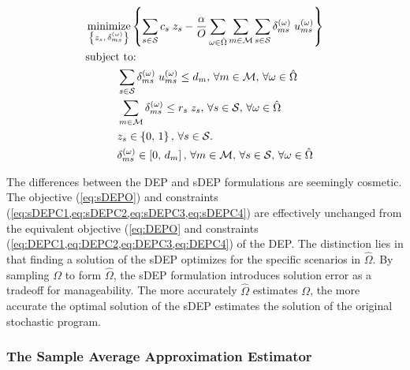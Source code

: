 \documentclass[12pt,dvipsnames]{report}
\DeclareMathOperator*{\argmin}{minimize}
\begin{document}
\begin{tcolorbox}[floatplacement = !ht, float, title = Sampled Deterministic Equivalent Program (sDEP) of \Cref{eq:SOPS1O,eq:SOPS1C1,eq:SOPS2O,eq:SOPS2C1,eq:SOPS2C2,eq:SOPS2C3,eq:SOPS2C4}]
\begin{align}
& \argmin_{\left\{ z_s,\, \delta_{ms}^{\left( \omega \right)} \right\}} \left\{ \sum_{s \in \mathcal{S}} c_s \; z_s - \frac{\alpha}{O} \sum_{\omega \in \hat{\Omega}} \sum_{m \in \mathcal{M}} \sum_{s \in \mathcal{S}} \delta_{ms}^{\left( \omega \right)} \; u_{ms}^{\left( \omega \right)} \right\} \label{eq:sDEPO}\\
& \text{subject to:}  \nonumber \\
& \hspace{0.4in} \sum_{s \in \mathcal{S}} \delta_{ms}^{\left( \omega \right)} \; u_{ms}^{\left( \omega \right)} \leq d_m,\, \forall m \in \mathcal{M},\, \forall \omega \in \hat{\Omega} \label{eq:sDEPC1}\\
& \hspace{0.4in} \sum_{m \in \mathcal{M}} \delta_{ms}^{\left( \omega \right)} \leq r_s \; z_s,\, \forall s \in \mathcal{S},\, \forall \omega \in \hat{\Omega} \label{eq:sDEPC2}\\
& \hspace{0.4in} z_s \in \left\{ 0,\, 1 \right\},\, \forall s \in \mathcal{S}. \label{eq:sDEPC3}\\
& \hspace{0.4in} \delta_{ms}^{\left( \omega \right)} \in \left[ 0,\, d_m \right],\, \forall m \in \mathcal{M},\, \forall s \in \mathcal{S},\, \forall \omega \in \hat{\Omega} \label{eq:sDEPC4}
\end{align}
\end{tcolorbox}

The differences between the DEP and sDEP formulations are seemingly cosmetic.  The objective (\cref{eq:sDEPO}) and constraints (\cref{eq:sDEPC1,eq:sDEPC2,eq:sDEPC3,eq:sDEPC4}) are effectively unchanged from the equivalent objective (\cref{eq:DEPO} and constraints (\cref{eq:DEPC1,eq:DEPC2,eq:DEPC3,eq:DEPC4}) of the DEP.  The distinction lies in that finding a solution of the sDEP optimizes for the specific scenarios in $\hat{\Omega}$.  By sampling $\Omega$ to form $\hat{\Omega}$, the sDEP formulation introduces solution error as a tradeoff for manageability.  The more accurately $\hat{\Omega}$ estimates $\Omega$, the more accurate the optimal solution of the sDEP estimates the solution of the original stochastic program.

\subsubsection{The Sample Average Approximation Estimator} \label{subsubsec:dep_sampling_estimator}
\end{document}

